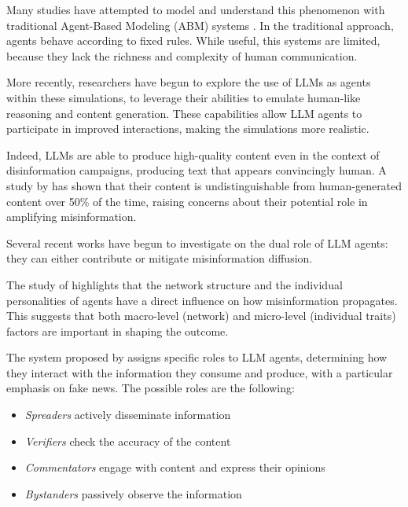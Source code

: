\medskip
Many studies have attempted to model and understand this phenomenon with traditional Agent-Based Modeling (ABM) systems \cite{gausen2021can, sulis2020, muhammad2024agent}. In the traditional approach, agents behave according to fixed rules. While useful, this systems are limited, because they lack the richness and complexity of human communication. 

\medskip
More recently, researchers have begun to explore the use of LLMs as agents within these simulations, to leverage their abilities to emulate human-like reasoning and content generation.
These capabilities allow LLM agents to participate in improved interactions, making the simulations more realistic.

Indeed, LLMs are able to produce high-quality content even in the context of disinformation campaigns, producing text that appears convincingly human. A study by \cite{williams2025hqdisinformation} has shown that their content is undistinguishable from human-generated content over 50\% of the time, raising concerns about their potential role in amplifying misinformation.

Several recent works have begun to investigate on the dual role of LLM agents: they can either contribute or mitigate misinformation diffusion.

\medskip
The study of \citet{hu2025simulatingrumorspreadingsocial} highlights that the network structure and the individual personalities of agents have a direct influence on how misinformation propagates. This suggests that both macro-level (network) and micro-level (individual traits) factors are important in shaping the outcome.

\medskip
The system proposed by \citet{liu2024tinyslipgiantleap} assigns specific roles to LLM agents, determining how they interact with the information they consume and produce, with a particular emphasis on fake news. 
The possible roles are the following: 

\begin{itemize}
    \item \textit{Spreaders} actively disseminate information
    \item \textit{Verifiers} check the accuracy of the content
    \item \textit{Commentators} engage with content and express their opinions
    \item \textit{Bystanders} passively observe the information
\end{itemize}

